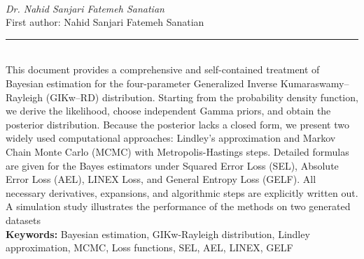 \documentclass[10pt,twoside]{article}
\begin{document}
\noindent\begin{minipage}[t][\textheight]{\textwidth}
\\[0.35em]
{\itshape Dr. Nahid Sanjari Fatemeh Sanatian}\\[0.2em]
{\footnotesize First author: Nahid Sanjari Fatemeh Sanatian}\\[0.45em]
\noindent\rule{\textwidth}{0.3pt}\\[0.4em]
{\footnotesize This document provides a comprehensive and self-contained treatment of Bayesian estimation for the four-parameter Generalized Inverse Kumaraswamy--Rayleigh (GIKw--RD) distribution. Starting from the probability density function, we derive the likelihood, choose independent Gamma priors, and obtain the posterior distribution. Because the posterior lacks a closed form, we present two widely used computational approaches: Lindley's approximation and Markov Chain Monte Carlo (MCMC) with Metropolis-Hastings steps. Detailed formulas are given for the Bayes estimators under Squared Error Loss (SEL), Absolute Error Loss (AEL), LINEX Loss, and General Entropy Loss (GELF). All necessary derivatives, expansions, and algorithmic steps are explicitly written out. A simulation study illustrates the performance of the methods on two generated datasets}\\[0.4em]
{\footnotesize\bfseries Keywords:} {\footnotesize Bayesian estimation, GIKw-Rayleigh distribution, Lindley approximation, MCMC, Loss functions, SEL, AEL, LINEX, GELF}\\[0.15em]
\vfill
\end{minipage}
\newpage
\end{document}
